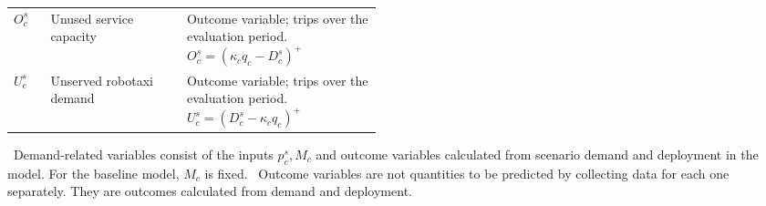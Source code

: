 \documentclass[10pt,a4paper]{article}
\newcommand{\note}{\textreferencemark\ }
\begin{document}
{\begin{tabularx}{\linewidth}{@{}>{\raggedright\arraybackslash}p{0.1\linewidth}>{\raggedright\arraybackslash}p{0.37\linewidth}Y@{}}
$O_c^s$ & Unused service capacity
& Outcome variable; trips over the evaluation period. \newline $O_c^s =(\kappa_c q_c-D_c^s)^+$ \\

$U_c^s$ & Unserved robotaxi demand
& Outcome variable; trips over the evaluation period. \newline $U_c^s=(D_c^s-\kappa_c q_c)^+$ \\


\bottomrule
\end{tabularx}
}

\note Demand-related variables consist of the inputs $p_c^s,M_c$ and outcome variables calculated from scenario demand and deployment in the model. For the baseline model, $M_c$ is fixed.
\note Outcome variables are not quantities to be predicted by collecting data for each one separately. They are outcomes calculated from demand and deployment.
\end{document}
